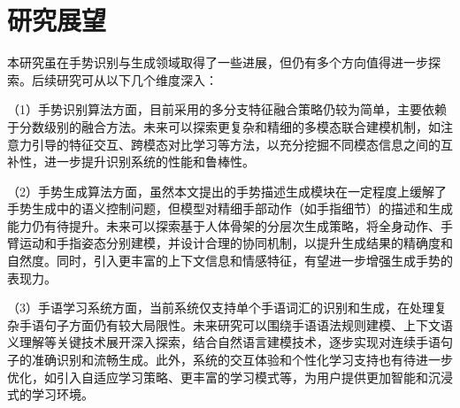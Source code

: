 \section{研究展望}
本研究虽在手势识别与生成领域取得了一些进展，但仍有多个方向值得进一步探索。后续研究可从以下几个维度深入：

（1）手势识别算法方面，目前采用的多分支特征融合策略仍较为简单，主要依赖于分数级别的融合方法。未来可以探索更复杂和精细的多模态联合建模机制，如注意力引导的特征交互、跨模态对比学习等方法，以充分挖掘不同模态信息之间的互补性，进一步提升识别系统的性能和鲁棒性。

（2）手势生成算法方面，虽然本文提出的手势描述生成模块在一定程度上缓解了手势生成中的语义控制问题，但模型对精细手部动作（如手指细节）的描述和生成能力仍有待提升。未来可以探索基于人体骨架的分层次生成策略，将全身动作、手臂运动和手指姿态分别建模，并设计合理的协同机制，以提升生成结果的精确度和自然度。同时，引入更丰富的上下文信息和情感特征，有望进一步增强生成手势的表现力。

（3）手语学习系统方面，当前系统仅支持单个手语词汇的识别和生成，在处理复杂手语句子方面仍有较大局限性。未来研究可以围绕手语语法规则建模、上下文语义理解等关键技术展开深入探索，结合自然语言建模技术，逐步实现对连续手语句子的准确识别和流畅生成。此外，系统的交互体验和个性化学习支持也有待进一步优化，如引入自适应学习策略、更丰富的学习模式等，为用户提供更加智能和沉浸式的学习环境。